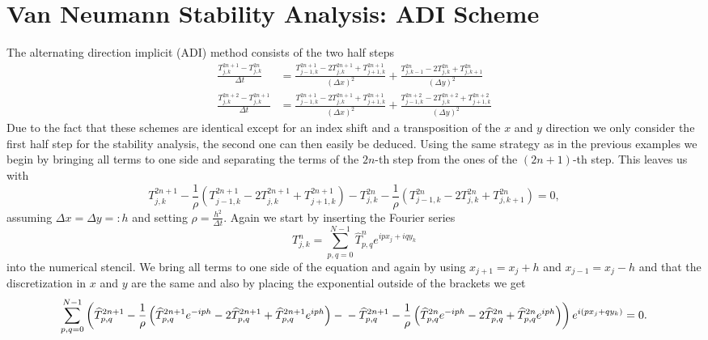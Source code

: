 \documentclass[a4aper,pagesize]{scrartcl}
\theoremstyle{definition}
\theoremstyle{plain}
\theoremstyle{remark}
\renewcommand{\hat}{\widehat}
\begin{document}
\section{Van Neumann Stability Analysis: ADI Scheme}
The alternating direction implicit (ADI) method  consists of the two half steps
\begin{align}
	\frac{T_{j,k}^{2n+1} - T_{j,k}^{2n}}{\Delta t}
	&= \frac{T_{j-1,k}^{2n+1} - 2 T_{j,k}^{2n+1} + T_{j+1,k}^{2n+1}}{(\Delta x)^2}
	+ \frac{T_{j,k-1}^{2n} - 2 T_{j,k}^{2n} + T_{j,k+1}^{2n}}{(\Delta y)^2}
\\
	\frac{T_{j,k}^{2n+2} - T_{j,k}^{2n+1}}{\Delta t}
	&= \frac{T_{j-1,k}^{2n+1} - 2 T_{j,k}^{2n+1} + T_{j+1,k}^{2n+1}}{(\Delta x)^2}
	+ \frac{T_{j-1,k}^{2n+2} - 2 T_{j,k}^{2n+2} + T_{j+1,k}^{2n+2}}{(\Delta y)^2}
\end{align}
Due to the fact that these schemes are identical except for an index shift and a transposition of the $x$ and $y$ direction we only consider the first half step for the stability analysis, the second one can then easily be deduced. Using the same strategy as in the previous examples we begin by bringing all terms to one side and separating the terms of the $2n$-th step from the ones of the $(2n+1)$-th step. This leaves us with
\begin{equation}
	T_{j,k}^{2n+1}
	- \frac{1}{\rho}\left(
		T_{j-1,k}^{2n+1}
		-2T_{j,k}^{2n+1}
		+T_{j+1,k}^{2n+1}
	\right)
	-T_{j,k}^{2n}
	- \frac{1}{\rho}\left(
		T_{j-1,k}^{2n}
		-2T_{j,k}^{2n}
		+T_{j,k+1}^{2n}
	\right)
	=
	0,
\end{equation}
assuming $\Delta x = \Delta y =: h$ and setting $\rho = \frac{h^2}{\Delta t}$. Again we start by inserting the Fourier series
\begin{equation}
	T_{j,k}^n = \sum_{p,q = 0}^{N-1} \hat{T}^n_{p,q} e^{ipx_j + iqy_k}
\end{equation}
into the numerical stencil. We bring all terms to one side of the equation and again by using $x_{j+1} = {x_j} + h$ and $x_{j-1} = {x_j} - h$ and that the discretization in $x$ and $y$ are the same and also by placing the exponential outside of the brackets we get
\begin{dmath}
	\sum_{p,q = 0}^{N-1}\left(
		\hat{T}_{p,q}^{2n+1}
		-\frac{1}{\rho}\left(
			\hat{T}_{p,q}^{2n+1} e^{-iph}
			- 2 \hat{T}_{p,q}^{2n+1}
			+ \hat{T}_{p,q}^{2n+1} e^{iph}
		\right)
		-\\
		-\hat{T}_{p,q}^{2n+1}
		-\frac{1}{\rho}\left(
			\hat{T}_{p,q}^{2n} e^{-iph}
			- 2 \hat{T}_{p,q}^{2n}
			+ \hat{T}_{p,q}^{2n} e^{iph}
		\right)
	\right)
	e^{i(px_j + qy_k)}
	=
	0.
\end{dmath}
\end{document}
